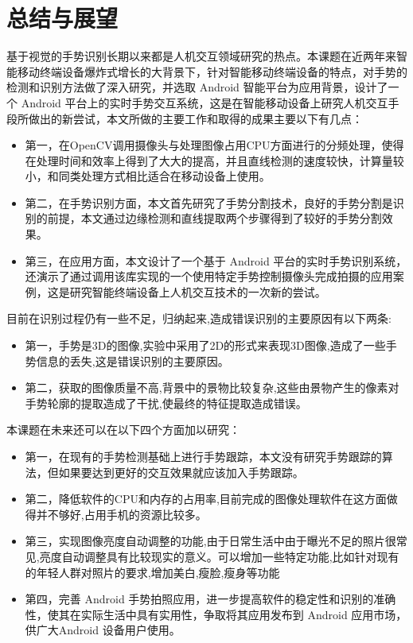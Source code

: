 \documentclass{XDBAthesis}
\begin{document}
\else
\fi
\chapter{总结与展望}

基于视觉的手势识别长期以来都是人机交互领域研究的热点。本课题在近两年来智能移动终端设备爆炸式增长的大背景下，针对智能移动终端设备的特点，对手势的检测和识别方法做了深入研究，并选取 Android 智能平台为应用背景，设计了一个 Android 平台上的实时手势交互系统，这是在智能移动设备上研究人机交互手段所做出的新尝试，本文所做的主要工作和取得的成果主要以下有几点：
\begin{itemize}

\item 第一，在OpenCV调用摄像头与处理图像占用CPU方面进行的分频处理，使得在处理时间和效率上得到了大大的提高，并且直线检测的速度较快，计算量较小，和同类处理方式相比适合在移动设备上使用。

\item 第二，在手势识别方面，本文首先研究了手势分割技术，良好的手势分割是识别的前提，本文通过边缘检测和直线提取两个步骤得到了较好的手势分割效果。

\item 第三，在应用方面，本文设计了一个基于 Android 平台的实时手势识别系统，还演示了通过调用该库实现的一个使用特定手势控制摄像头完成拍摄的应用案例，这是研究智能终端设备上人机交互技术的一次新的尝试。
\end{itemize}

目前在识别过程仍有一些不足，归纳起来,造成错误识别的主要原因有以下两条:
\begin{itemize}
\item 第一，手势是3D的图像,实验中采用了2D的形式来表现3D图像,造成了一些手势信息的丢失,这是错误识别的主要原因。

\item 第二，获取的图像质量不高,背景中的景物比较复杂,这些由景物产生的像素对手势轮廓的提取造成了干扰,使最终的特征提取造成错误。

\end{itemize}
本课题在未来还可以在以下四个方面加以研究：
\begin{itemize}
\item 第一，在现有的手势检测基础上进行手势跟踪，本文没有研究手势跟踪的算法，但如果要达到更好的交互效果就应该加入手势跟踪。

\item 第二，降低软件的CPU和内存的占用率,目前完成的图像处理软件在这方面做得并不够好,占用手机的资源比较多。

\item 第三，实现图像亮度自动调整的功能,由于日常生活中由于曝光不足的照片很常见,亮度自动调整具有比较现实的意义。可以增加一些特定功能,比如针对现有的年轻人群对照片的要求,增加美白,瘦脸,瘦身等功能

\item 第四，完善 Android 手势拍照应用，进一步提高软件的稳定性和识别的准确性，使其在实际生活中具有实用性，争取将其应用发布到 Android 应用市场，供广大Android 设备用户使用。
\end{itemize}

\ifx\allfiles\undefined
%

\end{document}
